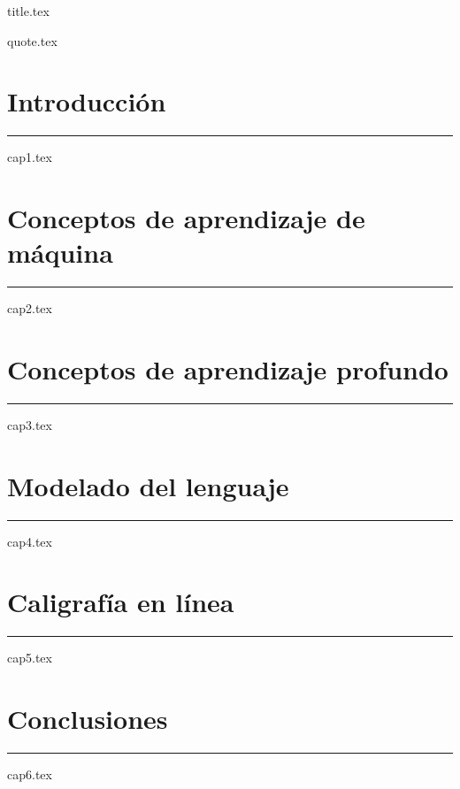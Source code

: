\documentclass[12 pt, oneside]{book}
\numberwithin{equation}{section}
\theoremstyle{plain}
\theoremstyle{definition}
\begin{document}
\frontmatter
{title.tex}

{quote.tex}

\let\cleardoublepage\clearpage
\tableofcontents
\clearpage
\thispagestyle{empty}

\let\cleardoublepage\clearpage

\mainmatter
\ChTitleUpperCase

\chapter{Introducción}
\noindent
\rule{\textwidth}{1pt}
{cap1.tex}
\chapter{Conceptos de aprendizaje de máquina}
\noindent
\rule{\textwidth}{1pt}
{cap2.tex}
\chapter{Conceptos de aprendizaje profundo}
\noindent
\rule{\textwidth}{1pt}
{cap3.tex}
\chapter{Modelado del lenguaje}
\noindent
\rule{\textwidth}{1pt}
{cap4.tex}
\chapter{Caligrafía en línea}
\noindent
\rule{\textwidth}{1pt}
{cap5.tex}
\chapter{Conclusiones}
\noindent
\rule{\textwidth}{1pt}
{cap6.tex}

\backmatter



\newpage
\end{document}
